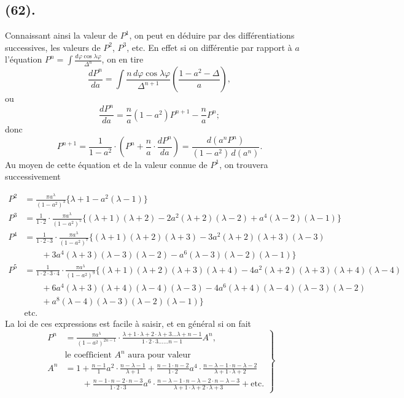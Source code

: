 \documentclass{article}
\begin{document}
\subsection*{(62).}

Connaissant ainsi la valeur de $P^{1}$, on peut en déduire par des différentiations successives, les valeurs de $P^{2}$, $P^{3}$, etc. En effet si on différentie par rapport à $a$ l'équation $\displaystyle P^{n}=\int\frac{d\varphi\cos\lambda\varphi}{\Delta^{n}}$, on en tire
\[ \frac{dP^{n}}{da}=\int\frac{n\,d\varphi\cos\lambda\varphi}{\Delta^{n+1}}\left(\frac{1-a^{2}-\Delta}{a}\right), \]
ou
\[ \frac{dP^{n}}{da}=\frac{n}{a}(1-a^{2})P^{n+1}-\frac{n}{a}P^{n}; \]
donc
\[ P^{n+1}=\frac{1}{1-a^{2}}\cdot\left(P^{n}+\frac{n}{a}\cdot\frac{dP^{n}}{da}\right)=\frac{d(a^{n}P^{n})}{(1-a^{2})\,d(a^{n})}. \tag{2} \]
Au moyen de cette équation et de la valeur connue de $P^{1}$, on trouvera successivement

\[ \begin{aligned} P^{2}&=\frac{\pi a^{\lambda}}{(1-a^{2})^{3}}\{\lambda+1-a^{2}(\lambda-1)\}\\ P^{3}&=\frac{1}{1\cdot2}\cdot\frac{\pi a^{\lambda}}{(1-a^{2})^{5}}\{(\lambda+1)(\lambda+2)-2a^{2}(\lambda+2)(\lambda-2)+a^{4}(\lambda-2)(\lambda-1)\}\\ P^{4}&=\frac{1}{1\cdot2\cdot3}\cdot\frac{\pi a^{\lambda}}{(1-a^{2})^{7}}\{(\lambda+1)(\lambda+2)(\lambda+3)-3a^{2}(\lambda+2)(\lambda+3)(\lambda-3)\\ &\qquad+3a^{4}(\lambda+3)(\lambda-3)(\lambda-2)-a^{6}(\lambda-3)(\lambda-2)(\lambda-1)\}\\ P^{5}&=\frac{1}{1\cdot2\cdot3\cdot4}\cdot\frac{\pi a^{\lambda}}{(1-a^{2})^{9}}\{(\lambda+1)(\lambda+2)(\lambda+3)(\lambda+4)-4a^{2}(\lambda+2)(\lambda+3)(\lambda+4)(\lambda-4)\\ &\qquad+6a^{4}(\lambda+3)(\lambda+4)(\lambda-4)(\lambda-3)-4a^{6}(\lambda+4)(\lambda-4)(\lambda-3)(\lambda-2)\\ &\qquad+a^{8}(\lambda-4)(\lambda-3)(\lambda-2)(\lambda-1)\}\\ &\text{etc.} \end{aligned} \]
La loi de ces expressions est facile à saisir, et en général si on fait
\[ \left.\begin{aligned} P^{n}&=\frac{\pi a^{\lambda}}{(1-a^{2})^{2n-1}}\cdot\frac{\lambda+1\cdot\lambda+2\cdot\lambda+3\ldots\lambda+n-1}{1\cdot2\cdot3\ldots\ldots n-1}A^{n},\\ &\text{le coefficient }A^{n}\text{ aura pour valeur}\\ A^{n}&=1+\frac{n-1}{1}a^{2}\cdot\frac{n-\lambda-1}{\lambda+1}+\frac{n-1\cdot n-2}{1\cdot2}a^{4}\cdot\frac{n-\lambda-1\cdot n-\lambda-2}{\lambda+1\cdot\lambda+2}\\ &\qquad+\frac{n-1\cdot n-2\cdot n-3}{1\cdot2\cdot3}a^{6}\cdot\frac{n-\lambda-1\cdot n-\lambda-2\cdot n-\lambda-3}{\lambda+1\cdot\lambda+2\cdot\lambda+3}+\text{etc.} \end{aligned}\right\} \tag{3} \]
\end{document}
